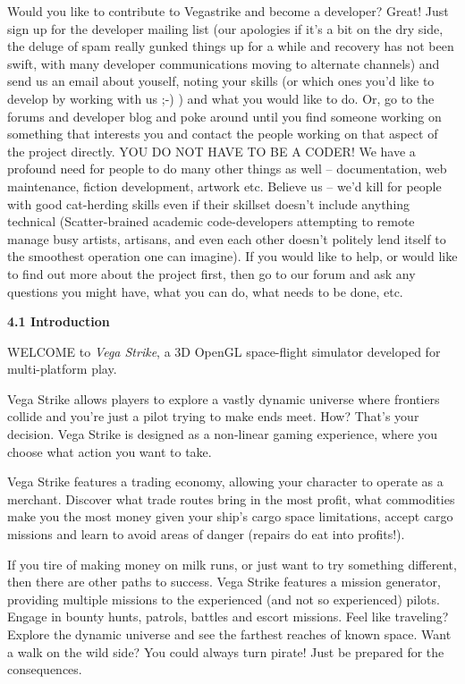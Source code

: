 \documentclass{article}
\begin{document}
Would you like to contribute to Vegastrike and become a developer? Great! Just sign up for the developer mailing list (our apologies if it's a bit on the dry side, the deluge of spam really gunked things up for a while and recovery has not been swift, with many developer communications moving to alternate channels) and send us an email about youself, noting your skills (or which ones you'd like to develop by working with us ;-) ) and what you would like to do. Or, go to the forums and developer blog and poke around until you find someone working on something that interests you and contact the people working on that aspect of the project directly. YOU DO NOT HAVE TO BE A CODER! We have a profound need for people to do many other things as well -- documentation, web maintenance, fiction development, artwork etc. Believe us -- we'd kill for people with good cat-herding skills even if their skillset doesn't include anything technical (Scatter-brained academic code-developers attempting to remote manage busy artists, artisans, and even each other doesn't politely lend itself to the smoothest operation one can imagine). If you would like to help, or would like to find out more about the project first, then go to our forum and ask any questions you might have, what you can do, what needs to be done, etc. 

\textbf{}

\textbf{4.1 Introduction }

WELCOME to \textit{Vega Strike}, a 3D OpenGL space-flight simulator developed for multi-platform play. 



Vega Strike allows players to explore a vastly dynamic universe where frontiers collide and you're just a pilot trying to make ends meet. How? That's your decision. Vega Strike is designed as a non-linear gaming experience, where you choose what action you want to take. 



Vega Strike features a trading economy, allowing your character to operate as a merchant. Discover what trade routes bring in the most profit, what commodities make you the most money given your ship's cargo space limitations, accept cargo missions and learn to avoid areas of danger (repairs do eat into profits!). 



If you tire of making money on milk runs, or just want to try something different, then there are other paths to success. Vega Strike features a mission generator, providing multiple missions to the experienced (and not so experienced) pilots. Engage in bounty hunts, patrols, battles and escort missions. Feel like traveling? Explore the dynamic universe and see the farthest reaches of known space. Want a walk on the wild side? You could always turn pirate! Just be prepared for the consequences. 
\end{document}
